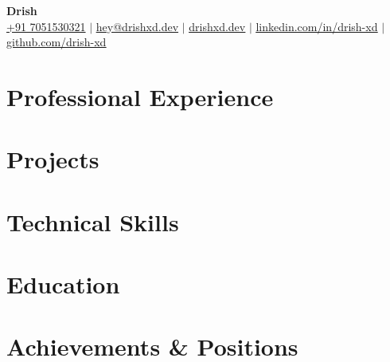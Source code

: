 \documentclass[a4paper,11pt]{article}
\begin{document}
\begin{center}
    \textbf{\Huge Drish} \\ \vspace{1pt}
    \small
    \href{tel:+917051530321}{+91 7051530321}
    $|$
    \href{mailto:hey@drishxd.dev}{\ul{hey@drishxd.dev}}
    $|$
    \href{https://drishxd.dev}{\ul{drishxd.dev}}
    $|$
    \href{https://linkedin.com/in/drish-xd}{\ul{linkedin.com/in/drish-xd}}
    $|$
    \href{https://github.com/drish-xd}{\ul{github.com/drish-xd}}
\end{center}

\section{Professional Experience}
\sectionStart

\sectionEnd

\section{Projects}
\sectionStart

\sectionEnd

\section{Technical Skills}
\sectionStart
\li{
    
}
\sectionEnd

\section{Education}
\sectionStart

\vspace{2.5pt}
\sectionEnd

\section{Achievements \& Positions}
\sectionStart
\li{
    
}
\sectionEnd
\end{document}
